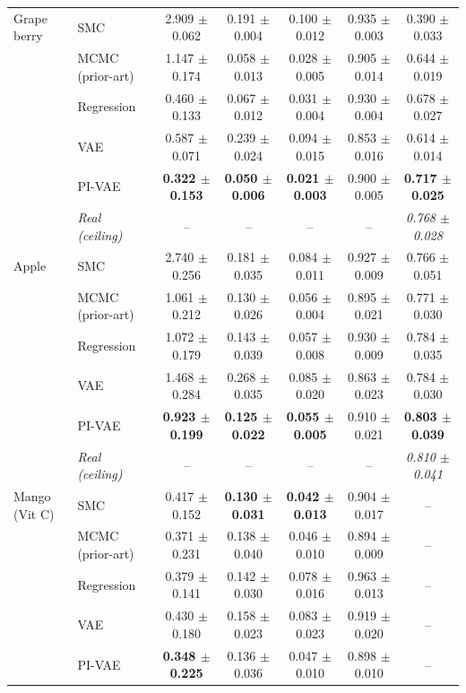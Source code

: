 \begin{table}[t]
\begin{tabular}{ll ccccc}
\midrule
Grape berry & SMC & 2.909 $\pm$ 0.062 & 0.191 $\pm$ 0.004 & 0.100 $\pm$ 0.012 & 0.935 $\pm$ 0.003 & 0.390 $\pm$ 0.033 \\
 & MCMC (prior-art) & 1.147 $\pm$ 0.174 & 0.058 $\pm$ 0.013 & 0.028 $\pm$ 0.005 & 0.905 $\pm$ 0.014 & 0.644 $\pm$ 0.019 \\
 & Regression & 0.460 $\pm$ 0.133 & 0.067 $\pm$ 0.012 & 0.031 $\pm$ 0.004 & 0.930 $\pm$ 0.004 & 0.678 $\pm$ 0.027 \\
 & VAE & 0.587 $\pm$ 0.071 & 0.239 $\pm$ 0.024 & 0.094 $\pm$ 0.015 & 0.853 $\pm$ 0.016 & 0.614 $\pm$ 0.014 \\
 & PI-VAE & \textbf{0.322 $\pm$ 0.153} & \textbf{0.050 $\pm$ 0.006} & \textbf{0.021 $\pm$ 0.003} & 0.900 $\pm$ 0.005 & \textbf{0.717 $\pm$ 0.025} \\
 & \textit{Real (ceiling)} & -- & -- & -- & -- & \textit{0.768 $\pm$ 0.028} \\
\midrule
Apple & SMC & 2.740 $\pm$ 0.256 & 0.181 $\pm$ 0.035 & 0.084 $\pm$ 0.011 & 0.927 $\pm$ 0.009 & 0.766 $\pm$ 0.051 \\
 & MCMC (prior-art) & 1.061 $\pm$ 0.212 & 0.130 $\pm$ 0.026 & 0.056 $\pm$ 0.004 & 0.895 $\pm$ 0.021 & 0.771 $\pm$ 0.030 \\
 & Regression & 1.072 $\pm$ 0.179 & 0.143 $\pm$ 0.039 & 0.057 $\pm$ 0.008 & 0.930 $\pm$ 0.009 & 0.784 $\pm$ 0.035 \\
 & VAE & 1.468 $\pm$ 0.284 & 0.268 $\pm$ 0.035 & 0.085 $\pm$ 0.020 & 0.863 $\pm$ 0.023 & 0.784 $\pm$ 0.030 \\
 & PI-VAE & \textbf{0.923 $\pm$ 0.199} & \textbf{0.125 $\pm$ 0.022} & \textbf{0.055 $\pm$ 0.005} & 0.910 $\pm$ 0.021 & \textbf{0.803 $\pm$ 0.039} \\
 & \textit{Real (ceiling)} & -- & -- & -- & -- & \textit{0.810 $\pm$ 0.041} \\
\midrule
Mango (Vit C) & SMC & 0.417 $\pm$ 0.152 & \textbf{0.130 $\pm$ 0.031} & \textbf{0.042 $\pm$ 0.013} & 0.904 $\pm$ 0.017 & -- \\
 & MCMC (prior-art) & 0.371 $\pm$ 0.231 & 0.138 $\pm$ 0.040 & 0.046 $\pm$ 0.010 & 0.894 $\pm$ 0.009 & -- \\
 & Regression & 0.379 $\pm$ 0.141 & 0.142 $\pm$ 0.030 & 0.078 $\pm$ 0.016 & 0.963 $\pm$ 0.013 & -- \\
 & VAE & 0.430 $\pm$ 0.180 & 0.158 $\pm$ 0.023 & 0.083 $\pm$ 0.023 & 0.919 $\pm$ 0.020 & -- \\
 & PI-VAE & \textbf{0.348 $\pm$ 0.225} & 0.136 $\pm$ 0.036 & 0.047 $\pm$ 0.010 & 0.898 $\pm$ 0.010 & -- \\

\end{tabular}
\end{table}
